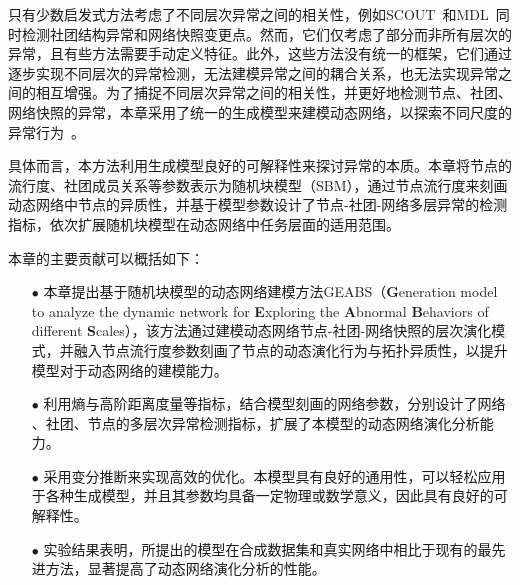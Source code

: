 只有少数启发式方法考虑了不同层次异常之间的相关性，例如SCOUT~\cite{hulovatyy2016scout}和MDL~\cite{cheung2020simultaneous}同时检测社团结构异常和网络快照变更点。然而，它们仅考虑了部分而非所有层次的异常，且有些方法需要手动定义特征。此外，这些方法没有统一的框架，它们通过逐步实现不同层次的异常检测，无法建模异常之间的耦合关系，也无法实现异常之间的相互增强。为了捕捉不同层次异常之间的相关性，并更好地检测节点、社团、网络快照的异常，本章采用了统一的生成模型来建模动态网络，以探索不同尺度的异常行为~\cite{wang2019nodes,cheng2008robust,darst2016detection}。 



具体而言，本方法利用生成模型良好的可解释性来探讨异常的本质。本章将节点的流行度、社团成员关系等参数表示为随机块模型（SBM），通过节点流行度来刻画动态网络中节点的异质性，并基于模型参数设计了节点-社团-网络多层异常的检测指标，依次扩展随机块模型在动态网络中任务层面的适用范围。

本章的主要贡献可以概括如下：


\begin{itemize} 
    \item[$\bullet$] 本章提出基于随机块模型的动态网络建模方法GEABS（\textbf{G}eneration model to analyze the dynamic network for \textbf{E}xploring the \textbf{A}bnormal \textbf{B}ehaviors of different \textbf{S}cales），该方法通过建模动态网络节点-社团-网络快照的层次演化模式，并融入节点流行度参数刻画了节点的动态演化行为与拓扑异质性，以提升模型对于动态网络的建模能力。
    \item[$\bullet$] 利用熵与高阶距离度量等指标，结合模型刻画的网络参数，分别设计了网络 、社团、节点的多层次异常检测指标，扩展了本模型的动态网络演化分析能力。
    \item[$\bullet$] 采用变分推断来实现高效的优化。本模型具有良好的通用性，可以轻松应用于各种生成模型，并且其参数均具备一定物理或数学意义，因此具有良好的可解释性。 
    \item[$\bullet$] 实验结果表明，所提出的模型在合成数据集和真实网络中相比于现有的最先进方法，显著提高了动态网络演化分析的性能。
\end{itemize}


